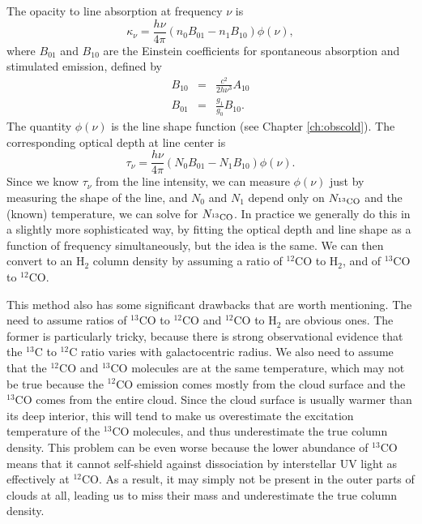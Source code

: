 The opacity to line absorption at frequency $\nu$ is
\begin{equation}
\kappa_{\nu} = \frac{h\nu}{4\pi} (n_0 B_{01} - n_1 B_{10}) \phi(\nu),
\end{equation}
where $B_{01}$ and $B_{10}$ are the Einstein coefficients for spontaneous absorption and stimulated emission, defined by 
\begin{eqnarray}
B_{10} & = & \frac{c^2}{2 h \nu^3} A_{10} \\
B_{01} & = & \frac{g_1}{g_0} B_{10}.
\end{eqnarray}
The quantity $\phi(\nu)$ is the line shape function (see Chapter \ref{ch:obscold}). The corresponding optical depth at line center is
\begin{equation}
\tau_{\nu} = \frac{h\nu}{4\pi} (N_0 B_{01} - N_1 B_{10}) \phi(\nu).
\end{equation}
Since we know $\tau_{\nu}$ from the line intensity, we can measure $\phi(\nu)$ just by measuring the shape of the line, and $N_0$ and $N_1$ depend only on $N_{\rm ^{13}CO}$ and the (known) temperature, we can solve for $N_{\rm ^{13}CO}$.  In practice we generally do this in a slightly more sophisticated way, by fitting the optical depth and line shape as a function of frequency simultaneously, but the idea is the same. We can then convert to an H$_2$ column density by assuming a ratio of $^{12}$CO to H$_2$, and of $^{13}$CO to $^{12}$CO.

This method also has some significant drawbacks that are worth mentioning. The need to assume ratios of $^{13}$CO to $^{12}$CO and $^{12}$CO to H$_2$ are obvious ones. The former is particularly tricky, because there is strong observational evidence that the $^{13}$C to $^{12}$C ratio varies with galactocentric radius. We also need to assume that the $^{12}$CO and $^{13}$CO molecules are at the same temperature, which may not be true because the $^{12}$CO emission comes mostly from the cloud surface and the $^{13}$CO comes from the entire cloud. Since the cloud surface is usually warmer than its deep interior, this will tend to make us overestimate the excitation temperature of the $^{13}$CO molecules, and thus underestimate the true column density. This problem can be even worse because the lower abundance of $^{13}$CO means that it cannot self-shield against dissociation by interstellar UV light as effectively at $^{12}$CO. As a result, it may simply not be present in the outer parts of clouds at all, leading us to miss their mass and underestimate the true column density.

